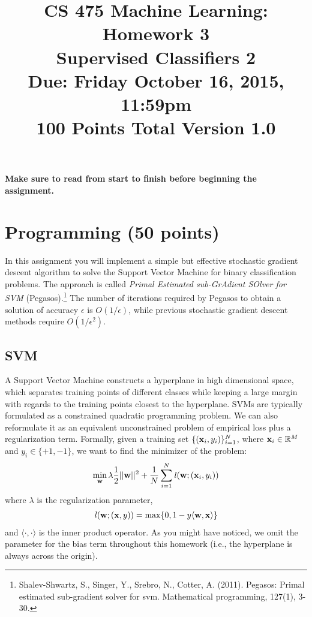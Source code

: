\documentclass[11pt]{article}
\title{CS 475 Machine Learning: Homework 3\\Supervised Classifiers 2\\
\Large{Due: Friday October 16, 2015, 11:59pm}\\
100 Points Total \hspace{1cm} Version 1.0}
\author{}
\date{}
\newcommand{\vw}{{\bf w}}
\newcommand{\vx}{{\bf x}}
\newcommand{\vxi}{{\bf x}_i}
\newcommand{\yi}{y_i}
\begin{document}
\large
\maketitle
\thispagestyle{headings}

\vspace{-.5in}

{\bf Make sure to read from start to finish before beginning the assignment.}
\section{Programming (50 points)}
In this assignment you will implement a simple but effective stochastic gradient descent algorithm to solve the Support Vector Machine
for binary classification problems. The approach is called \textit{Primal Estimated sub-GrAdient SOlver for SVM} (Pegasos).\footnote{Shalev-Shwartz, S., Singer, Y., Srebro, N., Cotter, A. (2011). Pegasos: Primal estimated sub-gradient solver for svm. Mathematical programming, 127(1), 3-30.}
The number of iterations required by Pegasos to obtain a solution of accuracy $\epsilon$ is $O(1/\epsilon)$, while previous stochastic gradient descent methods require $O(1/\epsilon^2)$.

\subsection{SVM}
A Support Vector Machine constructs a hyperplane in high dimensional space, which separates training points of different classes while keeping a large margin with regards to the training points closest to the hyperplane. SVMs are typically formulated as a constrained quadratic programming problem. We can also reformulate it as an equivalent unconstrained problem of empirical loss plus a regularization term. Formally, given a training set $\{(\vxi,\yi)\}_{i=1}^N$, where $\vx_i \in \mathbb{R}^M$ and $y_i \in\{+1,-1\}$, we want to find the minimizer of the problem:
\begin{align}
\label{eq:obj}
\min_\vw \lambda \frac{1}{2}||\vw||^2+\frac{1}{N} \sum\limits_{i=1}^N \mathit{l}(\vw;(\vxi,\yi))
\end{align}
where $\lambda$ is the regularization parameter,
\begin{align}
\mathit{l}(\vw;(\vx,y))=\max\{0,1-y\langle \vw , \vx\rangle\}
\end{align}
and $\langle\cdot,\cdot\rangle$ is the inner product operator. As you might have noticed, we omit the parameter for the bias term throughout this homework (i.e., the hyperplane is always across the origin).
\end{document}
